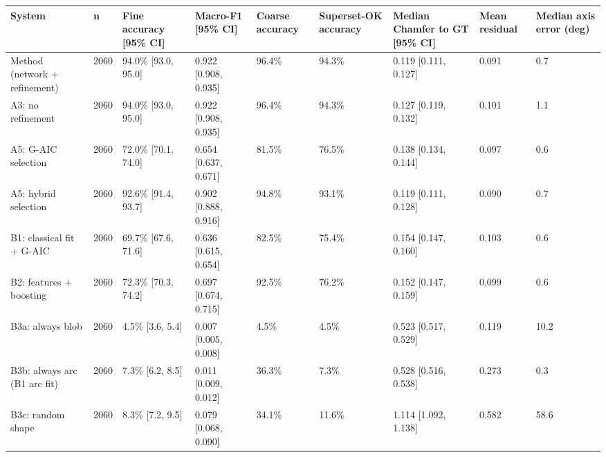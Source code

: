\scriptsize
\begin{tabular}{lllllllll}
\toprule
\textbf{System} & \textbf{n} & \textbf{Fine accuracy [95\% CI]} & \textbf{Macro-F1 [95\% CI]} & \textbf{Coarse accuracy} & \textbf{Superset-OK accuracy} & \textbf{Median Chamfer to GT [95\% CI]} & \textbf{Mean residual} & \textbf{Median axis error (deg)} \\
\midrule
Method (network + refinement) & 2060 & 94.0\% [93.0, 95.0] & 0.922 [0.908, 0.935] & 96.4\% & 94.3\% & 0.119 [0.111, 0.127] & 0.091 & 0.7 \\
A3: no refinement & 2060 & 94.0\% [93.0, 95.0] & 0.922 [0.908, 0.935] & 96.4\% & 94.3\% & 0.127 [0.119, 0.132] & 0.101 & 1.1 \\
A5: G-AIC selection & 2060 & 72.0\% [70.1, 74.0] & 0.654 [0.637, 0.671] & 81.5\% & 76.5\% & 0.138 [0.134, 0.144] & 0.097 & 0.6 \\
A5: hybrid selection & 2060 & 92.6\% [91.4, 93.7] & 0.902 [0.888, 0.916] & 94.8\% & 93.1\% & 0.119 [0.111, 0.128] & 0.090 & 0.7 \\
B1: classical fit + G-AIC & 2060 & 69.7\% [67.6, 71.6] & 0.636 [0.615, 0.654] & 82.5\% & 75.4\% & 0.154 [0.147, 0.160] & 0.103 & 0.6 \\
B2: features + boosting & 2060 & 72.3\% [70.3, 74.2] & 0.697 [0.674, 0.715] & 92.5\% & 76.2\% & 0.152 [0.147, 0.159] & 0.099 & 0.6 \\
B3a: always blob & 2060 & 4.5\% [3.6, 5.4] & 0.007 [0.005, 0.008] & 4.5\% & 4.5\% & 0.523 [0.517, 0.529] & 0.119 & 10.2 \\
B3b: always arc (B1 arc fit) & 2060 & 7.3\% [6.2, 8.5] & 0.011 [0.009, 0.012] & 36.3\% & 7.3\% & 0.528 [0.516, 0.538] & 0.273 & 0.3 \\
B3c: random shape & 2060 & 8.3\% [7.2, 9.5] & 0.079 [0.068, 0.090] & 34.1\% & 11.6\% & 1.114 [1.092, 1.138] & 0.582 & 58.6 \\
\bottomrule
\end{tabular}
